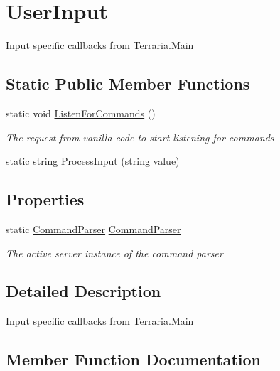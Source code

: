 \hypertarget{classOTA_1_1Callbacks_1_1UserInput}{}\section{User\+Input}
\label{classOTA_1_1Callbacks_1_1UserInput}


Input specific callbacks from Terraria.\+Main  


\subsection*{Static Public Member Functions}
\begin{DoxyCompactItemize}
\item 
static void \hyperlink{classOTA_1_1Callbacks_1_1UserInput_aaaa1873429c2b751faf7a2dac0840961}{Listen\+For\+Commands} ()
\begin{DoxyCompactList}\small\item\em The request from vanilla code to start listening for commands \end{DoxyCompactList}\item 
static string \hyperlink{classOTA_1_1Callbacks_1_1UserInput_acba5a66b8708fbb6baac7f6f013e9826}{Process\+Input} (string value)
\end{DoxyCompactItemize}
\subsection*{Properties}
\begin{DoxyCompactItemize}
\item 
static \hyperlink{classOTA_1_1Command_1_1CommandParser}{Command\+Parser} \hyperlink{classOTA_1_1Callbacks_1_1UserInput_ae6746e74d1d9ce9cb1a481999446f6ee}{Command\+Parser}
\begin{DoxyCompactList}\small\item\em The active server instance of the command parser \end{DoxyCompactList}\end{DoxyCompactItemize}


\subsection{Detailed Description}
Input specific callbacks from Terraria.\+Main 



\subsection{Member Function Documentation}
\hypertarget{classOTA_1_1Callbacks_1_1UserInput_aaaa1873429c2b751faf7a2dac0840961}{}

